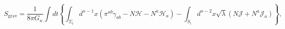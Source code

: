 \begin{equation}
S_\textrm{grav}=\frac{1}{8\pi G_n}\int dt \left\{\int_{\Sigma_t} 
  d^{n-1}x\left(\pi^{ab} \dot \gamma_{ab} - N\mathcal{H}
  - N^a \mathcal{H}_a\right)-\int_{S_t} d^{n-2}x\sqrt{\lambda}
  \left(N\mathcal{J}+N^a\mathcal{J}_a \right)\right\},
\end{equation}

